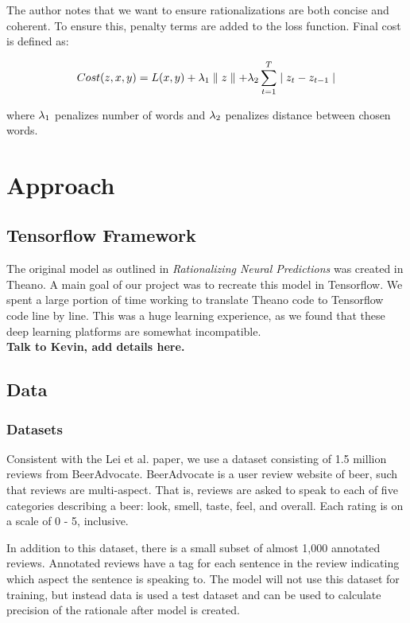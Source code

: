 \documentclass{article} %
\begin{document}
The author notes that we want to ensure rationalizations are both concise and
coherent. To ensure this, penalty terms are added to the loss function. Final
cost is defined as:

\begin{gather}
Cost(z,x,y) = 
L(x,y) + \lambda \textsubscript{1} \parallel z \parallel + 
\lambda \textsubscript{2} \sum_{t = 1}^{T}  \mid z_t - z_{t-1} \mid
\end{gather}

where $\lambda \textsubscript{1}$ penalizes number of words and $\lambda
\textsubscript{2}$ penalizes distance between chosen words.

\section{Approach}

\subsection{Tensorflow Framework}

The original model as outlined in \textit{Rationalizing Neural Predictions} was
created in Theano. A main goal of our project was to recreate this model in
Tensorflow. We spent a large portion of time working to translate Theano code to
Tensorflow code line by line. This was a huge learning experience, as we found
that these deep learning platforms are somewhat incompatible. \\

\textbf{Talk to Kevin, add details here.}

\subsection{Data}

\subsubsection{Datasets}

Consistent with the Lei et al. paper, we use a dataset consisting of 1.5 million
reviews from BeerAdvocate. BeerAdvocate is a user review website of beer, such
that reviews are multi-aspect. That is, reviews are asked to speak to each of
five categories describing a beer: look, smell, taste, feel, and overall. Each
rating is on a scale of 0 - 5, inclusive.

In addition to this dataset, there is a small subset of almost 1,000 annotated
reviews. Annotated reviews have a tag for each sentence in the review indicating
which aspect the sentence is speaking to. The model will not use this dataset
for training, but instead data is used a test dataset and can be used to
calculate precision of the rationale after model is created.
\end{document}
